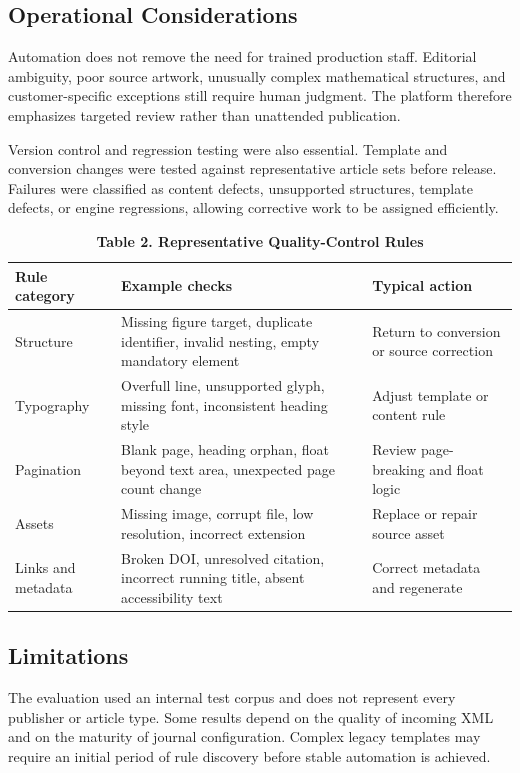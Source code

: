 \documentclass{tnqjournal}
\begin{document}
\subsection{Operational Considerations}
Automation does not remove the need for trained production staff. Editorial ambiguity, poor source artwork, unusually complex mathematical structures, and customer-specific exceptions still require human judgment. The platform therefore emphasizes targeted review rather than unattended publication.

Version control and regression testing were also essential. Template and conversion changes were tested against representative article sets before release. Failures were classified as content defects, unsupported structures, template defects, or engine regressions, allowing corrective work to be assigned efficiently.

\begin{table}[t]
\centering
\fontsize{7.3}{8.5}\selectfont
\caption*{\textbf{Table 2. Representative Quality-Control Rules}}
\begin{tabularx}{\textwidth}{@{}p{105pt}X p{118pt}@{}}
\toprule
\textbf{Rule category} & \textbf{Example checks} & \textbf{Typical action}\\
\midrule
Structure & Missing figure target, duplicate identifier, invalid nesting, empty mandatory element & Return to conversion or source correction\\
Typography & Overfull line, unsupported glyph, missing font, inconsistent heading style & Adjust template or content rule\\
Pagination & Blank page, heading orphan, float beyond text area, unexpected page count change & Review page-breaking and float logic\\
Assets & Missing image, corrupt file, low resolution, incorrect extension & Replace or repair source asset\\
Links and metadata & Broken DOI, unresolved citation, incorrect running title, absent accessibility text & Correct metadata and regenerate\\
\bottomrule
\end{tabularx}
\end{table}

\subsection{Limitations}
The evaluation used an internal test corpus and does not represent every publisher or article type. Some results depend on the quality of incoming XML and on the maturity of journal configuration. Complex legacy templates may require an initial period of rule discovery before stable automation is achieved.
\end{document}

